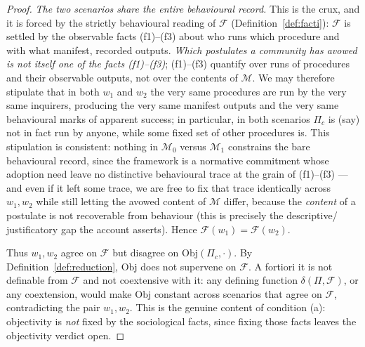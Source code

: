 \documentclass{amsart}
\theoremstyle{definition}
\theoremstyle{plain}
\theoremstyle{remark}
\begin{document}
\begin{proof}
\emph{The two scenarios share the entire behavioural record.} This is the
crux, and it is forced by the strictly behavioural reading of $\mathcal{F}$
(Definition~\ref{def:facti}): $\mathcal{F}$ is settled by the observable facts
(f1)--(f3) about who runs which procedure and with what manifest, recorded
outputs. \emph{Which postulates a community has avowed is not itself one of the
facts (f1)--(f3)}; (f1)--(f3) quantify over runs of procedures and their
observable outputs, not over the contents of $\mathcal{M}$. We may therefore
stipulate that in both $w_1$ and $w_2$ the very same procedures are run by the
very same inquirers, producing the very same manifest outputs and the very same
behavioural marks of apparent success; in particular, in both scenarios $\Pi_c$
is (say) not in fact run by anyone, while some fixed set of other procedures is.
This stipulation is consistent: nothing in $\mathcal{M}_0$ versus $\mathcal{M}_1$
constrains the bare behavioural record, since the framework is a normative
commitment whose adoption need leave no distinctive behavioural trace at the
grain of (f1)--(f3) --- and even if it left some trace, we are free to fix that
trace identically across $w_1,w_2$ while still letting the avowed content of
$\mathcal{M}$ differ, because the \emph{content} of a postulate is not
recoverable from behaviour (this is precisely the descriptive\slash
justificatory gap the account asserts). Hence $\mathcal{F}(w_1)=\mathcal{F}(w_2)$.

Thus $w_1,w_2$ agree on $\mathcal{F}$ but disagree on $\mathrm{Obj}(\Pi_c,
\cdot)$. By Definition~\ref{def:reduction}, $\mathrm{Obj}$ does not supervene on
$\mathcal{F}$. A fortiori it is not definable from $\mathcal{F}$ and not
coextensive with it: any defining function $\delta(\Pi,\mathcal{F})$, or any
coextension, would make $\mathrm{Obj}$ constant across scenarios that agree on
$\mathcal{F}$, contradicting the pair $w_1,w_2$. This is the genuine content of
condition (a): objectivity is \emph{not} fixed by the sociological facts, since
fixing those facts leaves the objectivity verdict open.


\end{proof}
\end{document}
